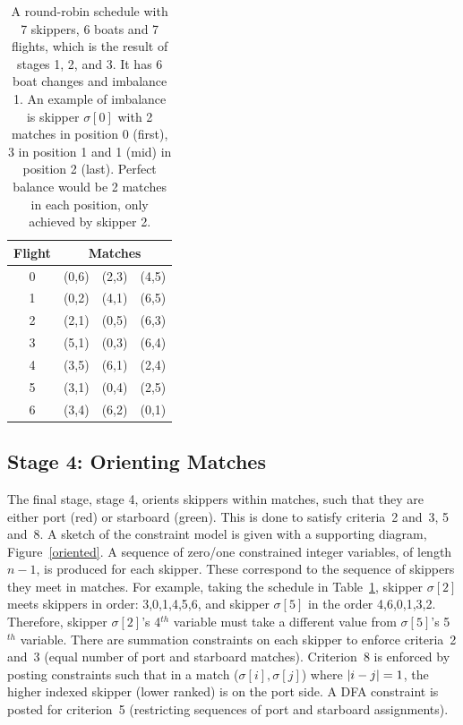 \documentclass{llncs}
\DeclarePairedDelimiter\abs{\lvert}{\rvert}
\begin{document}
\begin{table}
    \setlength{\tabcolsep}{3pt}
    \begin{tabular}{cccc}
        \toprule
        Flight & \multicolumn{3}{c}{Matches} \\ \midrule
        0 & (0,6) & (2,3) & (4,5) \\
        1 & (0,2) & (4,1) & (6,5) \\
        2 & (2,1) & (0,5) & (6,3) \\
        3 & (5,1) & (0,3) & (6,4) \\
        4 & (3,5) & (6,1) & (2,4) \\
        5 & (3,1) & (0,4) & (2,5) \\
        6 & (3,4) & (6,2) & (0,1) \\ \bottomrule
    \end{tabular}
    \caption{A round-robin schedule with 7 skippers, 6 boats and 7 flights, which is the result of
        stages 1, 2, and 3. It has 6 boat changes and imbalance 1. An example of imbalance is
        skipper $\sigma[{0}]$ with 2 matches in position 0 (first), 3 in position 1 and 1 (mid) in
        position 2 (last). Perfect balance would be 2 matches in each position, only achieved by
    skipper 2.}\label{tab2}
\end{table}

\subsection{Stage 4: Orienting Matches}

The final stage, stage 4, orients skippers within matches, such that they are either port (red) or
starboard (green). This is done to satisfy criteria~2 and~3, 5 and~8. A sketch of the constraint
model is given with a supporting diagram, Figure~\ref{oriented}.  A sequence of zero/one constrained
integer variables, of length $n-1$, is produced for each skipper. These correspond to the sequence
of skippers they meet in matches. For example, taking the schedule in Table~\ref{tab2}, skipper
$\sigma[{2}]$ meets skippers in order: 3,0,1,4,5,6, and skipper $\sigma[{5}]$ in the order
4,6,0,1,3,2.  Therefore, skipper $\sigma[{2}]$'s 4$^{th}$ variable must take a different value from
$\sigma[{5}]$'s 5$^{th}$ variable. There are summation constraints on each skipper to enforce
criteria~2 and~3 (equal number of port and starboard matches). Criterion~8 is enforced by posting
constraints such that in a match ($\sigma[{i}],\sigma[{j}]$) where $\abs*{i - j} = 1$, the higher
indexed skipper (lower ranked) is on the port side. A DFA constraint is posted for criterion~5
(restricting sequences of port and starboard assignments).
\end{document}
